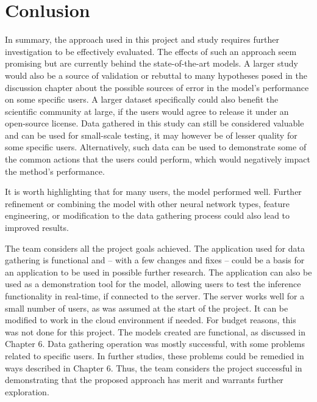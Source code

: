 
\chapter{Conlusion}

In summary, the approach used in this project and study requires further investigation to be effectively evaluated. The effects of such an approach seem promising but are currently behind the state-of-the-art models. A larger study would also be a source of validation or rebuttal to many hypotheses posed in the discussion chapter about the possible sources of error in the model's performance on some specific users. A larger dataset specifically could also benefit the scientific community at large, if the users would agree to release it under an open-source license. Data gathered in this study can still be considered valuable and can be used for small-scale testing, it may however be of lesser quality for some specific users. Alternatively, such data can be used to demonstrate some of the common actions that the users could perform, which would negatively impact the method's performance.

It is worth highlighting that for many users, the model performed well. Further refinement or combining the model with other neural network types, feature engineering, or modification to the data gathering process could also lead to improved results.

The team considers all the project goals achieved. The application used for data gathering is functional and -- with a few changes and fixes -- could be a basis for an application to be used in possible further research. The application can also be used as a demonstration tool for the model, allowing users to test the inference functionality in real-time, if connected to the server. The server works well for a small number of users, as was assumed at the start of the project. It can be modified to work in the cloud environment if needed. For budget reasons, this was not done for this project. The models created are functional, as discussed in Chapter 6. Data gathering operation was mostly successful, with some problems related to specific users. In further studies, these problems could be remedied in ways described in Chapter 6. Thus, the team considers the project successful in demonstrating that the proposed approach has merit and warrants further exploration.